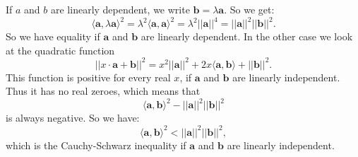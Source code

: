 \documentclass[12pt]{article}
\begin{document}
If $a$ and $b$ are linearly dependent, we write $\boldsymbol{b}=\lambda \boldsymbol{a}$. So we get:
$$\langle \boldsymbol{a},\lambda \boldsymbol{a}\rangle^2=\lambda^2\langle \boldsymbol{a},\boldsymbol{a}\rangle^2=\lambda^2 ||\boldsymbol{a}||^4=||\boldsymbol{a}||^2||\boldsymbol{b}||^2.$$
So we have equality if $\boldsymbol{a}$ and $\boldsymbol{b}$ are linearly dependent. In the other case we look at the quadratic function
$$||x\cdot \boldsymbol{a}+\boldsymbol{b}||^2=x^2||\boldsymbol{a}||^2+2x\langle\boldsymbol{a} ,\boldsymbol{b}\rangle + ||\boldsymbol{b}||^2.$$
This function is positive for every real $x$, if $\boldsymbol{a}$ and $\boldsymbol{b}$ are linearly independent. Thus it has no real zeroes, which means that
$$\langle\boldsymbol{a}, \boldsymbol{b}\rangle^2 - ||\boldsymbol{a}||^2 ||\boldsymbol{b}||^2$$
is always negative. So we have:
$$\langle\boldsymbol{a}, \boldsymbol{b}\rangle^2 < ||\boldsymbol{a}||^2||\boldsymbol{b}||^2,$$
which is the Cauchy-Schwarz inequality if $\boldsymbol{a}$ and $\boldsymbol{b}$ are linearly independent.
\end{document}
